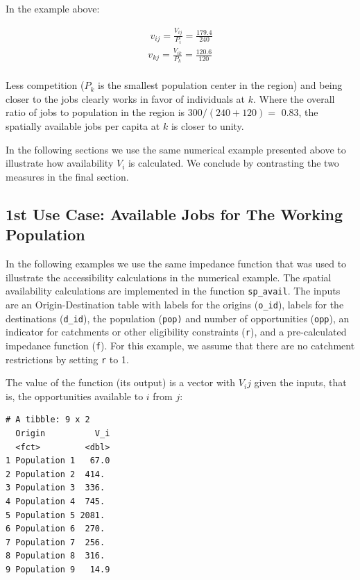 \documentclass[]{elsarticle} %
\begin{document}
In the example above:

\[
\begin{array}{l}\
v_{ij} = \frac{V_{ij}}{P_i} =  \frac{179.4}{240}\\
v_{kj} =  \frac{V_{ik}}{P_k} =  \frac{120.6}{120}\\
\end{array}
\]

Less competition (\(P_k\) is the smallest population center in the
region) and being closer to the jobs clearly works in favor of
individuals at \(k\). Where the overall ratio of jobs to population in
the region is \(300/(240 + 120)=\) 0.83, the spatially available jobs
per capita at \(k\) is closer to unity.

In the following sections we use the same numerical example presented
above to illustrate how availability \(V_i\) is calculated. We conclude
by contrasting the two measures in the final section.

\hypertarget{st-use-case-available-jobs-for-the-working-population}{%
\subsection{1st Use Case: Available Jobs for The Working
Population}\label{st-use-case-available-jobs-for-the-working-population}}

In the following examples we use the same impedance function that was
used to illustrate the accessibility calculations in the numerical
example. The spatial availability calculations are implemented in the
function \texttt{sp\_avail}. The inputs are an Origin-Destination table
with labels for the origins (\texttt{o\_id}), labels for the
destinations (\texttt{d\_id}), the population (\texttt{pop)} and number
of opportunities (\texttt{opp}), an indicator for catchments or other
eligibility constraints (\texttt{r}), and a pre-calculated impedance
function (\texttt{f}). For this example, we assume that there are no
catchment restrictions by setting \texttt{r} to 1.

The value of the function (its output) is a vector with \(V_ij\) given
the inputs, that is, the opportunities available to \(i\) from \(j\):

\begin{verbatim}
# A tibble: 9 x 2
  Origin          V_i
  <fct>         <dbl>
1 Population 1   67.0
2 Population 2  414. 
3 Population 3  336. 
4 Population 4  745. 
5 Population 5 2081. 
6 Population 6  270. 
7 Population 7  256. 
8 Population 8  316. 
9 Population 9   14.9
\end{verbatim}
\end{document}
